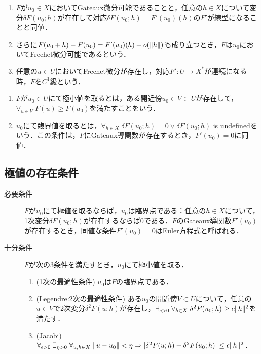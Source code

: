 \documentclass[uplatex,dvipdfmx]{jsreport}
\begin{document}
\begin{lemma}[微分との関係]\mbox{}
    \begin{enumerate}
        \item $F$が$u_0\in X$においてGateaux微分可能であることと，任意の$h\in X$について変分$\delta F(u_0;h)$が存在して対応$\delta F(u_0;h)=F'(u_0)(h)$の$F'$が線型になることと同値．
        \item さらに$F(u_0+h)-F(u_0)=F'(u_0)(h)+o(\|h\|)$も成り立つとき，$F$は$u_0$においてFrechet微分可能であるという．
        \item 任意の$u\in U$においてFrechet微分が存在し，対応$F':U\to X^*$が連続になる時，$F$を$C^1$級という．
    \end{enumerate}
\end{lemma}

\begin{definition}\mbox{}
    \begin{enumerate}
        \item $F$が$u_0\in U$にて極小値を取るとは，ある開近傍$u_0\in V\subset U$が存在して，$\forall_{u\in V}\;F(u)\ge F(u_0)$を満たすことをいう．
        \item $u_0$にて臨界値を取るとは，$\forall_{h\in X}\;\delta F(u_0;h)=0\lor\delta F(u_0;h)$ is undefinedをいう．この条件は，$F$にGateaux導関数が存在するとき，$F'(u_0)=0$に同値．
    \end{enumerate}
\end{definition}

\subsection{極値の存在条件}

\begin{theorem}[極値の特徴付け]\mbox{}
    \begin{description}
        \item[必要条件] $F$が$u_0$にて極値を取るならば，$u_0$は臨界点である：任意の$h\in X$について，1次変分$\delta F(u_0;h)$が存在するならば$0$である．$F$のGateaux導関数$F'(u_0)$が存在するとき，同値な条件$F'(u_0)=0$はEuler方程式と呼ばれる．
        \item[十分条件] $F$が次の3条件を満たすとき，$u_0$にて極小値を取る．
        \begin{enumerate}
            \item (1次の最適性条件) $u_0$は$F$の臨界点である．
            \item (Legendre:2次の最適性条件) ある$u_0$の開近傍$V\subset U$について，任意の$u\in V$で2次変分$\delta^2F(u;h)$が存在し，$\exists_{c>0}\;\forall_{h\in X}\;\delta^2 F(u_0;h)\ge c\|h\|^2$を満たす．
            \item (Jacobi) $\forall_{\epsilon>0}\;\exists_{\eta>0}\;\forall_{u,h\in X}\;\|u-u_0\|<\eta\Rightarrow\lvert\delta^2F(u;h)-\delta^2F(u_0;h)\rvert\le\epsilon\|h\|^2$．
        \end{enumerate}
    \end{description}
\end{theorem}
\end{document}
